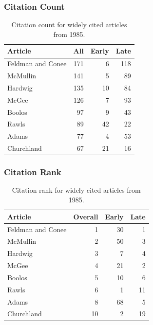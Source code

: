 \documentclass[
  10pt,
  letterpaper,
  DIV=11,
  numbers=noendperiod,
  twoside]{scrartcl}
\begin{document}
\subsubsection*{Citation Count}\label{sec-count-1985}

\begin{longtable}[]{@{}lrrr@{}}

\caption{\label{tbl-citation-count-1985}Citation count for widely cited
articles from 1985.}

\tabularnewline

\toprule\noalign{}
Article & All & Early & Late \\
\midrule\noalign{}
\endhead
\bottomrule\noalign{}
\endlastfoot
Feldman and Conee & 171 & 6 & 118 \\
McMullin & 141 & 5 & 89 \\
Hardwig & 135 & 10 & 84 \\
McGee & 126 & 7 & 93 \\
Boolos & 97 & 9 & 43 \\
Rawls & 89 & 42 & 22 \\
Adams & 77 & 4 & 53 \\
Churchland & 67 & 21 & 16 \\

\end{longtable}

\subsubsection*{Citation Rank}\label{sec-rank-1985}

\begin{longtable}[]{@{}lrrr@{}}

\caption{\label{tbl-citation-rank-1985}Citation rank for widely cited
articles from 1985.}

\tabularnewline

\toprule\noalign{}
Article & Overall & Early & Late \\
\midrule\noalign{}
\endhead
\bottomrule\noalign{}
\endlastfoot
Feldman and Conee & 1 & 30 & 1 \\
McMullin & 2 & 50 & 3 \\
Hardwig & 3 & 7 & 4 \\
McGee & 4 & 21 & 2 \\
Boolos & 5 & 10 & 6 \\
Rawls & 6 & 1 & 11 \\
Adams & 8 & 68 & 5 \\
Churchland & 10 & 2 & 19 \\

\end{longtable}
\end{document}
